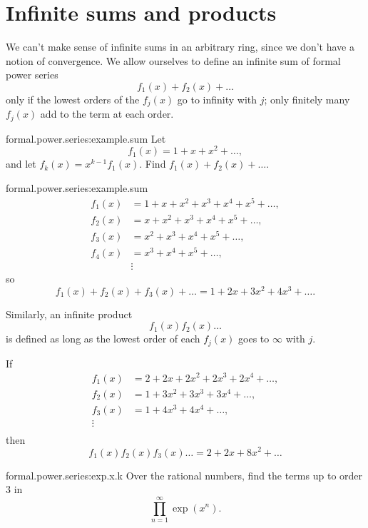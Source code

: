 \section{Infinite sums and products}
We can't make sense of infinite sums in an arbitrary ring, since we don't have a notion of convergence.
We allow ourselves to define an infinite sum of formal power series
\[
f_1(x)+f_2(x)+\dots
\]
only if the lowest orders of the \(f_j(x)\) go to infinity with \(j\); only finitely many \(f_j(x)\) add to the term at each order.
\begin{problem}{formal.power.series:example.sum}
Let 
\[
f_1(x)=1+x+x^2+\dots,
\]
and let \(f_k(x)=x^{k-1}f_1(x)\).
Find \(f_1(x)+f_2(x)+\dots\).
\end{problem}
\begin{answer}{formal.power.series:example.sum}
\begin{align*}
f_1(x)&=1+x+x^2+x^3+x^4+x^5+\dots,\\
f_2(x)&=x+x^2+x^3+x^4+x^5+\dots,\\
f_3(x)&=x^2+x^3+x^4+x^5+\dots,\\
f_4(x)&=x^3+x^4+x^5+\dots,\\
&\vdots
\end{align*}
so
\[
f_1(x)+f_2(x)+f_3(x)+\dots
=
1+2x+3x^2+4x^3+\dots.
\]
\end{answer}
Similarly, an infinite product
\[
f_1(x)f_2(x)\dots
\]
is defined as long as the lowest order of each \(f_j(x)\) goes to \(\infty\) with \(j\).
\begin{example}
If
\begin{align*}
f_1(x)&=2+2x+2x^2+2x^3+2x^4+\dots,\\
f_2(x)&=1+3x^2+3x^3+3x^4+\dots,\\
f_3(x)&=1+4x^3+4x^4+\dots,\\
\vdots&\\
\end{align*}
then
\[
f_1(x)f_2(x)f_3(x)\dots=2+2x+8x^2+\dots
\]
\end{example}
\begin{problem}{formal.power.series:exp.x.k}
Over the rational numbers, find the terms up to order \(3\) in
\[
\prod_{n=1}^{\infty}\exp(x^n).
\]
\end{problem}

